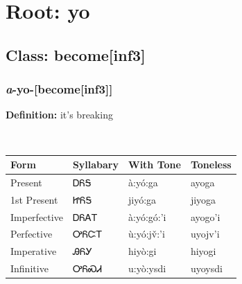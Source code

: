 \needspace{4in}
\section*{Root: yo}
\nopagebreak
{}
\needspace{3in}
\subsection*{Class: become[inf3]}
\nopagebreak
\needspace{2in}
\subsubsection*{\textit{a}{-}\textbf{yo}{-}[become[inf3]]}
\nopagebreak
\textbf{Definition: } it{\textquoteright}s breaking
\\[0.5em]
\begin{tabularx}{\textwidth}{l X X X}%
\toprule%
\textbf{Form}&\textbf{Syllabary}&\textbf{With Tone}&\textbf{Toneless}\\%
\midrule%
Present&ᎠᏲᎦ&à:yó:ga&ayoga\\%
1st Present&ᏥᏲᎦ&jiyó:ga&jiyoga\\%
Imperfective&ᎠᏲᎪᎢ&à:yó:gó:’i&ayogo’i\\%
Perfective&ᎤᏲᏨᎢ&ù:yó:jv̌:’i&uyojv’i\\%
Imperative&ᎯᏲᎩ&hiyò:gi&hiyogi\\%
Infinitive&ᎤᏲᏍᏗ&u:yò:ysdi&uyoysdi\\%
\bottomrule%
\end{tabularx}
\\[1em]